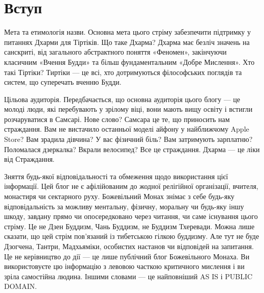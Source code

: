 \section{Вступ}

Мета та етимологія назви.
Основна мета цього стріму забезпечити підтримку
у питаннях Дхарми для Тіртіків. Що таке Дхарма?
Дхарма має безліч значень на санскриті, від
загального абстрактного поняття «Феномен», закінчуючи
класичним «Вчення Будди» та більш фундаментальним
«Добре Мислення». Хто такі Тіртіки? Тиртіки --- це
всі, хто дотримуються філософських поглядів та систем, що
суперечать вченню Будди.

Цільова аудиторія. Передбачається, що основна аудиторія
цього блогу --- це молоді люди, які перебувають у
зрілому віці, вони мають вищу освіту і встигли розчаруватися
в Самсарі. Нове слово? Самсара це те, що приносить
нам страждання. Вам не вистачило останньої моделі
айфону у найближчому Apple Store? Вам зрадила дівчина?
У вас фізичний біль? Вам затримують зарплатню? Поломалася
дзеркалка? Вкрали велосипед? Все це страждання.
Дхарма --- це ліки від Страждання.

Зняття будь-якої відповідальності та обмеження щодо
використання цієї інформації. Цей блог не є афілійованим
до жодної релігійної організації, вчителя, монастиря чи
сектарного руху. Божевільний Монах знімає з себе будь-яку
відповідальність за можливу ментальну, фізичну, моральну
чи будь-яку іншу шкоду, завдану прямо чи опосередковано
через читання, чи саме існування цього стріму. Це не Дзен
Буддизм, Чань Буддизм, не Буддизм Тхеревади. Можна лише сказати,
що цей стрім пов'язаний із тибетською гілкою буддизму.
Але тут не буде Дзогчена, Тантри, Мадхьяміки, особистих
настанов чи відповідей на запитання. Це не керівництво до дії ---
це лише публічний блог Божевільного Монаха. Ви використовуєте
цю інформацію з левовою часткою критичного мислення і ви зріла
самостійна людина. Іншими словами --- це найповніший AS IS і PUBLIC DOMAIN.
